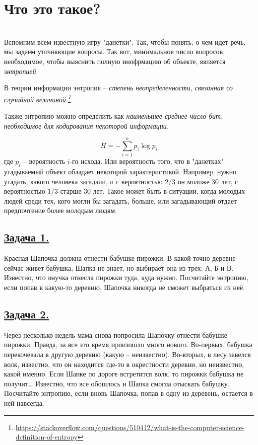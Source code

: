 \section*{Что это такое?}~\
\\

Вспомним всем известную игру "данетки". Так, чтобы понять, о чем идет речь, мы задаем уточняющие вопросы. Так вот, минимальное число вопросов, необходимое, чтобы выяснить полную инофрмацию об объекте, является \textit{энтропией}.

В теории информации энтропия -- \textit{степень неопределенности, связанная со случайной величиной.\footnote{\url{https://stackoverflow.com/questions/510412/what-is-the-computer-science-definition-of-entropy}}}

Также энтропию можно определить как \textit{наименьшее среднее число бит, необходимое для кодирования некоторой информации.}

\[H=-\sum\limits_{i=1}^n p_i\log p_i \]
где $p_i$ -- вероятность $i$-го исхода. Или вероятность того, что в "данетках" угадываемый объект обладает некоторой характеристикой. Например, нужно угадать, какого человека загадали, и с вероятностью $2/3$ он моложе 30 лет, с вероятностью $1/3$ старше 30 лет. Такое может быть в ситуации, когда молодых людей среди тех, кого могли бы загадать, больше, или загадывающий отдает предпочтение более молодым людям. 

\subsection*{\hyperref[sec:sol_problem1]{Задача 1.}}\label{sec:problem1} 
Красная Шапочка должна отнести бабушке пирожки. В какой точно деревне сейчас живет бабушка, Шапка не знает, но выбирает она из трех: А, Б и В. Известно, что внучка отнесла пирожки туда, куда нужно. Посчитайте энтропию, если попав в какую-то деревню, Шапочка никогда не сможет выбраться из неё.

\subsection*{\hyperref[sec:sol_problem2]{Задача 2.}}\label{sec:problem2}  Через несколько недель мама снова попросила Шапочку отнести бабушке пирожки. Правда, за все это время произошло много нового. Во-первых, бабушка перекочевала в другую деревню (какую – неизвестно). Во-вторых, в лесу завелся волк, известно, что он находится где-то в окрестности деревни, но неизвестно, какой именно. Если Шапке по дороге встретится волк, то пирожки бабушка не получит… Известно, что все обошлось и Шапка смогла отыскать бабушку. Посчитайте энтропию, если вновь Шапочка, попав в одну из деревень, остается в ней навсегда.

